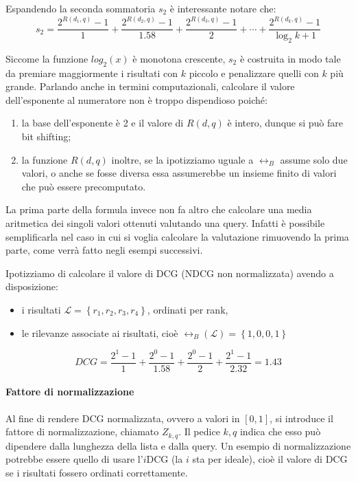 Espandendo la seconda sommatoria $s_2$ è interessante notare che:
$$
s_2 = \frac{2^{R(d_1, q) } - 1}{1} + \frac{2^{R(d_2, q)} - 1}{1.58} + \frac{2^{R(d_3, q)} - 1}{2} + \dotsb + \frac{2^{R(d_k, q) } - 1}{\log_2{k + 1}}
$$

Siccome la funzione $log_2(x)$ è monotona crescente, $s_2$ è costruita in modo tale da
premiare maggiormente i risultati con $k$ piccolo e penalizzare quelli con $k$ più grande.
Parlando anche in termini computazionali, calcolare il valore dell'esponente al numeratore
non è troppo dispendioso poiché:

\begin{enumerate}
	\item la base dell'esponente è 2 e il valore di $R(d,q)$ è intero, dunque si può fare bit shifting;
	\item la funzione $R(d,q)$ inoltre, se la ipotizziamo uguale a $\rel_B$ assume solo due valori,
	o anche se fosse diversa essa assumerebbe un insieme finito di valori che può essere precomputato.
\end{enumerate}

La prima parte della formula invece non fa altro che calcolare una media aritmetica
dei singoli valori ottenuti valutando una query. Infatti è possibile semplificarla
nel caso in cui si voglia calcolare la valutazione rimuovendo la prima parte, come verrà fatto
negli esempi successivi.

\begin{esempio}\label{eg:dcg}
	Ipotizziamo di calcolare il valore di DCG (NDCG non normalizzata) avendo a disposizione:
	\begin{itemize}
		\item i risultati $\mathcal{L} = \left\{r_1, r_2, r_3, r_4\right\}$, ordinati per rank,
		\item le rilevanze associate ai risultati, cioè $\rel_B\left(\mathcal{L}\right) = \left\{1, 0, 0, 1\right\}$
	\end{itemize}

$$
DCG = \frac{2^{1} - 1}{1} + \frac{2^{0} - 1}{1.58} + \frac{2^{0} - 1}{2} + \frac{2^{1} - 1}{2.32} = 1.43
$$
\end{esempio}

\paragraph{Fattore di normalizzazione}
Al fine di rendere DCG normalizzata, ovvero a valori in $\left[0, 1\right]$, si introduce il fattore di
normalizzazione, chiamato  $Z_{k, q}$. Il pedice $k,q$ indica che esso può dipendere dalla lunghezza
della lista e dalla query.
Un esempio di normalizzazione potrebbe essere quello di usare l'$i$DCG (la $i$ sta per ideale),
cioè il valore di DCG se i risultati fossero ordinati correttamente.

